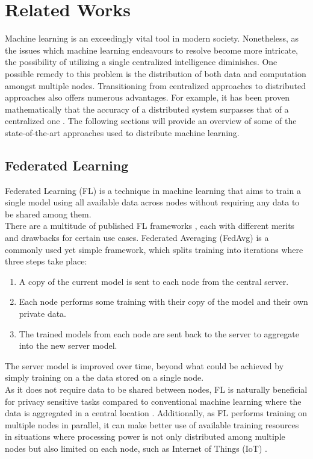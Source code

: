 \chapter{Related Works} \label{bg}
Machine learning is an exceedingly vital tool in modern society. Nonetheless, as the issues which machine learning endeavours to resolve become more intricate, the possibility of utilizing a single centralized intelligence diminishes. One possible remedy to this problem is the distribution of both data and computation amongst multiple nodes. Transitioning from centralized approaches to distributed approaches also offers numerous advantages. For example, it has been proven mathematically that the accuracy of a distributed system surpasses that of a centralized one \cite{swarmbetterthanone}. The following sections will provide an overview of some of the state-of-the-art approaches used to distribute machine learning.

\section{Federated Learning}
Federated Learning (FL) \cite{survey_on_fed_learning} is a technique in machine learning that aims to train a single model using all available data across nodes without requiring any data to be shared among them. \\

There are a multitude of published FL frameworks \cite{fed_table_survey}, each with different merits and drawbacks for certain use cases. Federated Averaging (FedAvg) \cite{fed_learning} is a commonly used yet simple framework, which splits training into iterations where three steps take place:
\begin{enumerate}
	\item A copy of the current model is sent to each node from the central server.
	\item Each node performs some training with their copy of the model and their own private data.
	\item The trained models from each node are sent back to the server to aggregate into the new server model.
\end{enumerate}
The server model is improved over time, beyond what could be achieved by simply training on a the data stored on a single node. \\

As it does not require data to be shared between nodes, FL is naturally beneficial for privacy sensitive tasks compared to conventional machine learning where the data is aggregated in a central location \cite{fed_privacy}. Additionally, as FL performs training on multiple nodes in parallel, it can make better use of available training resources in situations where processing power is not only distributed among multiple nodes but also limited on each node, such as Internet of Things (IoT) \cite{fed_iot_2}.

